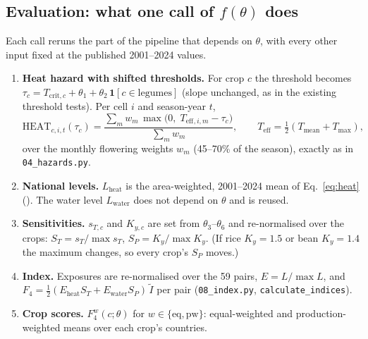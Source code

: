 \documentclass[11pt,a4paper]{article}
\numberwithin{equation}{section}
\newcommand{\Fd}{F_4}
\newcommand{\Teff}{T_{\text{eff}}}
\begin{document}
\subsection{Evaluation: what one call of $f(\theta)$ does}
Each call reruns the part of the pipeline that depends on $\theta$, with every other input fixed at the
published 2001--2024 values.
\begin{enumerate}[leftmargin=*]
\item \textbf{Heat hazard with shifted thresholds.} For crop $c$ the threshold becomes
$\tau_c = T_{\text{crit},c}+\theta_1+\theta_2\,\mathbf{1}[c\in\text{legumes}]$ (slope unchanged, as in the existing
threshold tests). Per cell $i$ and season-year $t$,
\begin{equation}\label{eq:heat}
\text{HEAT}_{c,i,t}(\tau_c)=\frac{\sum_m w_{m}\,\max\bigl(0,\;\Teff{}_{,i,m}-\tau_c\bigr)}{\sum_m w_{m}},\qquad
\Teff=\tfrac12(T_{\text{mean}}+T_{\max}),
\end{equation}
over the monthly flowering weights $w_m$ (45--70\% of the season), exactly as in \texttt{04\_hazards.py}.
\item \textbf{National levels.} $L_{\text{heat}}$ is the area-weighted, 2001--2024 mean of Eq.~\ref{eq:heat}
(). The water level $L_{\text{water}}$ does not depend on $\theta$ and is reused.
\item \textbf{Sensitivities.} $s_{T,c}$ and $K_{y,c}$ are set from $\theta_3$--$\theta_6$ and re-normalised over the
crops: $S_T=s_T/\max s_T$, $S_P=K_y/\max K_y$. (If rice $K_y=1.5$ or bean $K_y=1.4$ the maximum changes, so
every crop's $S_P$ moves.)
\item \textbf{Index.} Exposures are re-normalised over the 59 pairs, $E=L/\max L$, and
$\Fd=\tfrac12(E_{\text{heat}}S_T+E_{\text{water}}S_P)\,\tilde I$ per pair (\texttt{08\_index.py},
\texttt{calculate\_indices}).
\item \textbf{Crop scores.} $\Fd^{w}(c;\theta)$ for $w\in\{\text{eq},\text{pw}\}$: equal-weighted and
production-weighted means over each crop's countries.
\end{enumerate}
\end{document}
